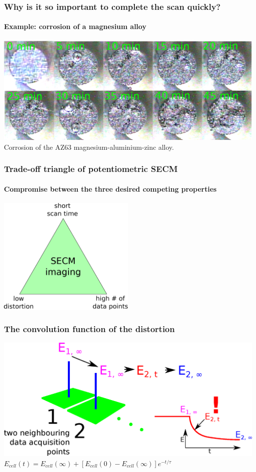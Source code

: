 \documentclass{beamer}
\begin{document}
\begin{frame}
	\frametitle{Why is it so important to complete the scan quickly?}
	\framesubtitle{Example: corrosion of a magnesium alloy}
	\includegraphics[width=1\textwidth]{timelapse.eps}\\
\centering
Corrosion of the AZ63 magnesium-aluminium-zinc alloy.
\end{frame} 

\begin{frame}
\frametitle{Trade-off triangle of potentiometric SECM}
\framesubtitle{Compromise between the three desired competing properties}
\begin{center}
\includegraphics[width=0.5\textwidth]{trade-off.eps}
\end{center}
\end{frame}

\begin{frame}
\frametitle{The convolution function of the distortion}
\centering	
\includegraphics[width=1\textwidth]{t.eps}\\
\vfill
$E_{cell}(t) = E_{cell}(\infty) + [E_{cell}(0) - E_{cell}(\infty)]e^{-t/\tau}$\\
\vfill
\end{frame}
\end{document}
